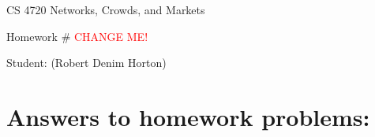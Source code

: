 \documentclass[11pt]{article}
\begin{document}
 

\rhead{\today}

\begin{center}\begin{Large}
CS 4720 Networks, Crowds, and Markets

Homework \#  \textcolor{red}{CHANGE ME!}

Student: (Robert Denim Horton)
\end{Large}
\end{center}

\section*{Answers to homework problems:}

\end{document}
